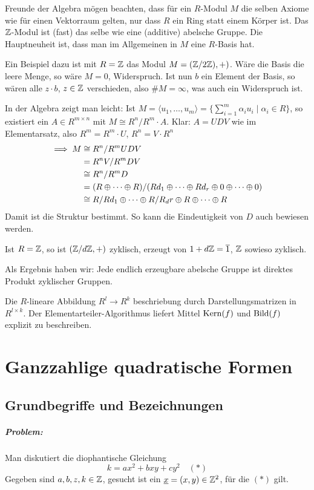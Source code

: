 \documentclass[a4paper,twoside,DIV15,BCOR12mm]{scrbook}
\begin{document}
Freunde der Algebra mögen beachten, dass für ein $R$-Modul $M$ die selben Axiome wie für einen Vektorraum gelten, nur dass $R$ ein Ring statt einem Körper ist. Das $\mathbb{Z}$-Modul ist (fast) das selbe wie eine (additive) abelsche Gruppe. Die Hauptneuheit ist, dass man im Allgemeinen in $M$ eine $R$-Basis hat.

Ein Beispiel dazu ist mit $R=\mathbb{Z}$ das Modul $M=(\mathbb{Z}/2\mathbb{Z}),+)$. Wäre die Basis die leere Menge, so wäre $M=0$, Widerspruch. Ist nun $b$ ein Element der Basis, so wären alle $z\cdot b$, $z\in\mathbb{Z}$ verschieden, also $\#M = \infty$, was auch ein Widerspruch ist.

In der Algebra zeigt man leicht: Ist $M = \langle u_1, \ldots, u_m \rangle = \{ \sum_{i=1}^m \alpha_i u_i \mid \alpha _i \in R \}$, so existiert ein $A\in R^{m\times n}$ mit $M \cong R^n/R^m\cdot A$. Klar: $A=UDV$ wie im Elementarsatz, also $R^m = R^m\cdot U$, $R^n=V\cdot R^n$
\begin{align*}
\implies M&\cong R^n/R^mUDV \\
&= R^nV/R^mDV \\
&\cong R^n/R^mD \\
&= (R\oplus \cdots \oplus R) / (Rd_1 \oplus \cdots \oplus Rd_r \oplus 0 \oplus \cdots \oplus 0) \\
&\cong R/Rd_1 \oplus \cdots \oplus R/R_dr \oplus R \oplus \cdots \oplus R
\end{align*}
Damit ist die Struktur bestimmt. So kann die Eindeutigkeit von $D$ auch bewiesen werden.

Ist $R=\mathbb{Z}$, so ist $(\mathbb{Z}/d\mathbb{Z},+)$ zyklisch, erzeugt von $1+d\mathbb{Z}=\overline 1$, $\mathbb{Z}$ sowieso zyklisch.

Als Ergebnis haben wir: Jede endlich erzeugbare abelsche Gruppe ist direktes Produkt zyklischer Gruppen.

Die $R$-lineare Abbildung $R^l \to R^k$ beschriebung durch Darstellungsmatrizen in $R^{l\times k}$. Der Elementarteiler-Algorithmus liefert Mittel $\mathop{\mathrm{Kern}}\nolimits(f)$ und $\mathop{\mathrm{Bild}}\nolimits(f)$ explizit zu beschreiben.

\chapter{Ganzzahlige quadratische Formen}

\section{Grundbegriffe und Bezeichnungen}

\paragraph{Problem:} Man diskutiert die diophantische Gleichung
\[ k = ax^2 + bxy + cy^2 \quad (*)\]
Gegeben sind $a,b,z,k \in\mathbb{Z}$, gesucht ist ein $\underline{x} = (x,y)\in\mathbb{Z}^2$, für die $(*)$ gilt.
\end{document}
